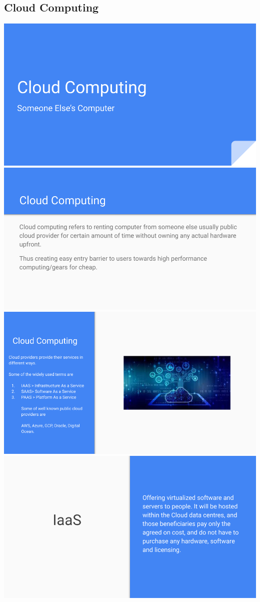 \documentclass[17pt,a4paper,oneside,margin=1in]{article}
\begin{document}
\subsection{Cloud Computing}
\begin{center}
	\includegraphics[width=0.7\linewidth]{./scrot/cloud.png}
	\includegraphics[width=0.7\linewidth]{./scrot/cloud1.png}
	\includegraphics[width=0.7\linewidth]{./scrot/cloud2.png}
	\includegraphics[width=0.7\linewidth]{./scrot/cloud3.png}
\end{center}
\end{document}
